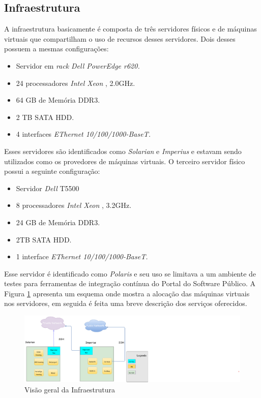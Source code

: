 \begin{apendicesenv}
\section{Infraestrutura}\label{sec:infraestrutura}
A infraestrutura basicamente é composta de três servidores físicos e de máquinas virtuais que compartilham o uso de recursos desses servidores. Dois desses possuem a mesmas configurações: 
\begin{itemize}
	\item Servidor em \textit{rack} \textit{Dell PowerEdge r620.}
	\item 24 processadores \textit{Intel Xeon }, 2.0GHz.
	\item 64 GB de Memória DDR3.
	\item 2 TB SATA HDD.
	\item 4 interfaces \textit{EThernet 10/100/1000-BaseT.}
\end{itemize}
Esses servidores são identificados como \textit{Solarian} e \textit{Imperius} e estavam sendo utilizados como os provedores de máquinas virtuais. O terceiro servidor físico possui a seguinte configuração:
\begin{itemize} 
	\item Servidor \textit{Dell} T5500
	\item 8 processadores \textit{Intel Xeon }, 3.2GHz.
	\item 24 GB de Memória DDR3.
	\item 2TB SATA HDD.
	\item 1 interface \textit{EThernet 10/100/1000-BaseT.}
\end{itemize} 
Esse servidor é identificado como \textit{Polaris} e seu uso se limitava a um ambiente de testes para ferramentas de integração contínua do Portal do Software Público. A Figura \ref{fig:infra_older} apresenta um esquema onde mostra a alocação das máquinas virtuais nos servidores, em seguida é feita uma breve descrição dos serviços oferecidos.

\begin{figure}[!h]
\centering
\includegraphics [keepaspectratio=true,scale=0.4]{figuras/vm_infra_older.eps}
\caption{Visão geral da Infraestrutura}
\label{fig:infra_older}
\end{figure}


\end{apendicesenv}
